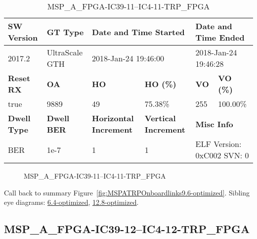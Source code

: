 \begin{table}[h]
\centering
\caption{MSP\_A\_FPGA-IC39-11--IC4-11-TRP\_FPGA}
\label{tab:MSPAFPGAIC3911IC411TRPFPGA9.6-optimized}
\begin{tabular}{@{}|l|l|l|l|l|l|@{}}
\toprule
\textbf{SW Version}                & \textbf{GT Type}   & \multicolumn{2}{l|}{\textbf{Date and Time Started}}            & \multicolumn{2}{l|}{\textbf{Date and Time Ended}}        \\ \midrule
2017.2                       & UltraScale GTH          & \multicolumn{2}{l|}{2018-Jan-24 19:46:00}                   & \multicolumn{2}{l|}{2018-Jan-24 19:46:28}               \\ \midrule
\textbf{Reset RX}                  & \textbf{OA} & \textbf{HO}   & \textbf{HO (\%)} & \textbf{VO} & \textbf{VO (\%)} \\ \midrule
true & 9889        & 49          & 75.38\%        & 255        & 100.00\%       \\ \midrule
\textbf{Dwell Type}                & \textbf{Dwell BER} & \textbf{Horizontal Increment} & \textbf{Vertical Increment}    & \multicolumn{2}{l|}{\textbf{Misc Info}}                  \\ \midrule
BER                            & 1e-7        & 1        & 1           & \multicolumn{2}{l|}{ELF Version: 0xC002 SVN: 0}                         \\ \bottomrule
\end{tabular}
\end{table}

\begin{figure}[h]
\caption{MSP\_A\_FPGA-IC39-11--IC4-11-TRP\_FPGA} \label{fig:MSPAFPGAIC3911IC411TRPFPGA9.6-optimized}
\end{figure}

Call back to summary Figure~\ref{fig:MSPATRPOnboardlinks9.6-optimized}.
Sibling eye diagrams: \hyperref[sec:MSPAFPGAIC3911IC411TRPFPGA6.4-optimized]{6.4-optimized}, \hyperref[sec:MSPAFPGAIC3911IC411TRPFPGA12.8-optimized]{12.8-optimized}.

\clearpage
\newpage


\subsection{MSP\_A\_FPGA-IC39-12--IC4-12-TRP\_FPGA}\label{sec:MSPAFPGAIC3912IC412TRPFPGA9.6-optimized}

